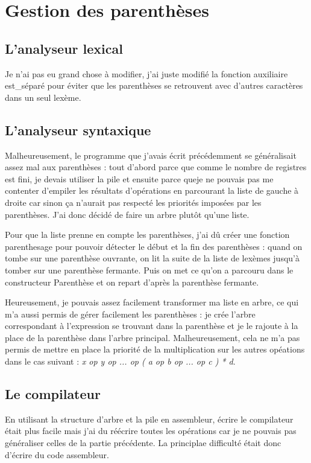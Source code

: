\documentclass{article}
\begin{document}
\section{Gestion des parenthèses}

\subsection{L'analyseur lexical}
Je n'ai pas eu grand chose à modifier, j'ai juste modifié la fonction auxiliaire est\_séparé pour éviter que les parenthèses se retrouvent avec d'autres caractères dans un seul lexème.

\subsection{L'analyseur syntaxique}
Malheureusement, le programme que j'avais écrit précédemment se généralisait assez mal aux parenthèses : tout d'abord parce que comme le nombre de registres est fini, je devais utiliser la pile et ensuite parce queje ne pouvais pas me contenter d'empiler les résultats d'opérations en parcourant la liste de gauche à droite car sinon ça n'aurait pas respecté les priorités imposées par les parenthèses. J'ai donc décidé de faire un arbre plutôt qu'une liste.\par
Pour que la liste prenne en compte les parenthèses, j'ai dû créer une fonction parenthesage pour pouvoir détecter le début et la fin des parenthèses : quand on tombe sur une parenthèse ouvrante, on lit la suite de la liste de lexèmes jusqu'à tomber sur une parenthèse fermante. Puis on met ce qu'on a parcouru dans le constructeur Parenthèse et on repart d'après la parenthèse fermante.\par
Heureusement, je pouvais assez facilement transformer ma liste en arbre, ce qui m'a aussi permis de gérer facilement les parenthèses : je crée l'arbre correspondant à l'expression se trouvant dans la parenthèse et je le rajoute à la place de la parenthèse dans l'arbre principal. Malheureusement, cela ne m'a pas permis de mettre en place la priorité de la multiplication sur les autres opéations dans le cas suivant : \emph{ x op y op ... op ( a op b op ... op c ) * d}.

\subsection{Le compilateur}
En utilisant la structure d'arbre et la pile en assembleur, écrire le compilateur était plus facile mais j'ai du réécrire toutes les opérations car je ne pouvais pas généraliser celles de la partie précédente. La principlae difficulté était donc d'écrire du code assembleur.
\end{document}
